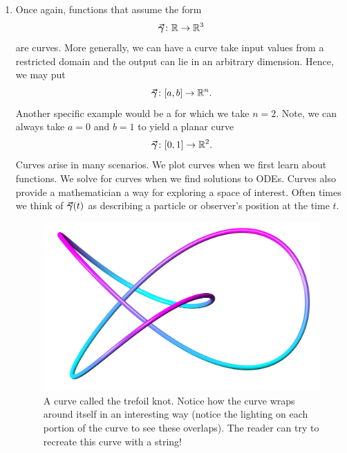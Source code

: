         \begin{enumerate}[(1)]
        \item Once again, functions that assume the form
        \[
        \boldsymbol{\vec{\gamma}} \colon \mathbb{R}\to \mathbb{R}^3
        \]
        are curves. More generally, we can have a curve take input values from a restricted domain and the output can lie in an arbitrary dimension. Hence, we may put
        \[
        \boldsymbol{\vec{\gamma}} \colon [a,b]\to \mathbb{R}^n.
        \]
        Another specific example would be a  for which we take $n=2$. Note, we can always take $a=0$ and $b=1$ to yield a planar curve 
        \[
            \boldsymbol{\vec{\gamma}} \colon [0,1] \to \mathbb{R}^2.
        \]
        Curves arise in many scenarios. We plot curves when we first learn about functions. We solve for curves when we find solutions to ODEs. Curves also provide a mathematician a way for exploring a space of interest. Often times we think of $\boldsymbol{\vec{\gamma}}(t)$ as describing a particle or observer's position at the time $t$.

        \begin{figure}[H]
            \centering
            \includegraphics[width=.8\textwidth]{Figures_Part_5/trefoil_knot.png}
            \caption{A curve called the trefoil knot. Notice how the curve wraps around itself in an interesting way (notice the lighting on each portion of the curve to see these overlaps). The reader can try to recreate this curve with a string!}
        \end{figure}
        

\end{enumerate}
